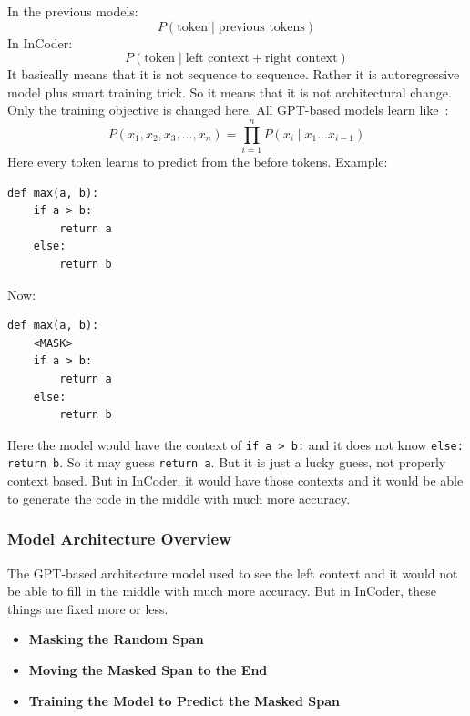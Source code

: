 \documentclass[12pt]{article}
\begin{document}
In the previous models:
\begin{equation}
P(\text{token} \mid \text{previous tokens})
\end{equation}
In InCoder:
\begin{equation}
P(\text{token} \mid \text{left context} + \text{right context})
\end{equation}
It basically means that it is not sequence to sequence. Rather it is autoregressive model plus smart training trick. So it means that it is not architectural change. Only the training objective is changed here.
All GPT-based models learn like~\cite{fried2023incodergenerativemodelcode}:
\begin{equation}
P(x_1, x_2, x_3, \ldots, x_n) = \prod_{i=1}^{n} P(x_i \mid x_1 \ldots x_{i-1})
\end{equation}
Here every token learns to predict from the before tokens.
Example:
\begin{lstlisting}
def max(a, b):
	if a > b:
		return a
	else:
		return b
\end{lstlisting}
Now:
\begin{lstlisting}
def max(a, b):
	<MASK>
	if a > b:
		return a
	else:
		return b
\end{lstlisting}
Here the model would have the context of \texttt{if a > b:} and it does not know \texttt{else: return b}. So it may guess \texttt{return a}. But it is just a lucky guess, not properly context based. But in InCoder, it would have those contexts and it would be able to generate the code in the middle with much more accuracy. 
\subsubsection{Model Architecture Overview}
The GPT-based architecture model used to see the left context and it would not be able to fill in the middle with much more accuracy. But in InCoder, these things are fixed more or less.
\begin{itemize}
	\item \textbf{Masking the Random Span}
	\item \textbf{Moving the Masked Span to the End}
	\item \textbf{Training the Model to Predict the Masked Span}
\end{itemize}
\end{document}
